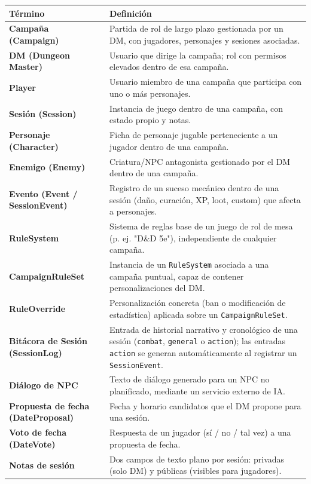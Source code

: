 {\small\setlength{\tabcolsep}{4pt}\renewcommand{\arraystretch}{1.15}
\begin{longtable}{|>{\raggedright\arraybackslash}p{4.2cm}|>{\raggedright\arraybackslash}p{11.1cm}|}
\hline
\textbf{Término} & \textbf{Definición} \\ \hline\endhead
\textbf{Campaña (Campaign)} & Partida de rol de largo plazo gestionada por un DM, con jugadores, personajes y sesiones asociadas. \\ \hline
\textbf{DM (Dungeon Master)} & Usuario que dirige la campaña; rol con permisos elevados dentro de esa campaña. \\ \hline
\textbf{Player} & Usuario miembro de una campaña que participa con uno o más personajes. \\ \hline
\textbf{Sesión (Session)} & Instancia de juego dentro de una campaña, con estado propio y notas. \\ \hline
\textbf{Personaje (Character)} & Ficha de personaje jugable perteneciente a un jugador dentro de una campaña. \\ \hline
\textbf{Enemigo (Enemy)} & Criatura/NPC antagonista gestionado por el DM dentro de una campaña. \\ \hline
\textbf{Evento (Event / SessionEvent)} & Registro de un suceso mecánico dentro de una sesión (daño, curación, XP, loot, custom) que afecta a personajes. \\ \hline
\textbf{RuleSystem} & Sistema de reglas base de un juego de rol de mesa (p. ej. "D\&D 5e"), independiente de cualquier campaña. \\ \hline
\textbf{CampaignRuleSet} & Instancia de un \texttt{RuleSystem} asociada a una campaña puntual, capaz de contener personalizaciones del DM. \\ \hline
\textbf{RuleOverride} & Personalización concreta (ban o modificación de estadística) aplicada sobre un \texttt{CampaignRuleSet}. \\ \hline
\textbf{Bitácora de Sesión (SessionLog)} & Entrada de historial narrativo y cronológico de una sesión (\texttt{combat}, \texttt{general} o \texttt{action}); las entradas \texttt{action} se generan automáticamente al registrar un \texttt{SessionEvent}. \\ \hline
\textbf{Diálogo de NPC} & Texto de diálogo generado para un NPC no planificado, mediante un servicio externo de IA. \\ \hline
\textbf{Propuesta de fecha (DateProposal)} & Fecha y horario candidatos que el DM propone para una sesión. \\ \hline
\textbf{Voto de fecha (DateVote)} & Respuesta de un jugador (sí / no / tal vez) a una propuesta de fecha. \\ \hline
\textbf{Notas de sesión} & Dos campos de texto plano por sesión: privadas (solo DM) y públicas (visibles para jugadores). \\ \hline
\end{longtable}}
